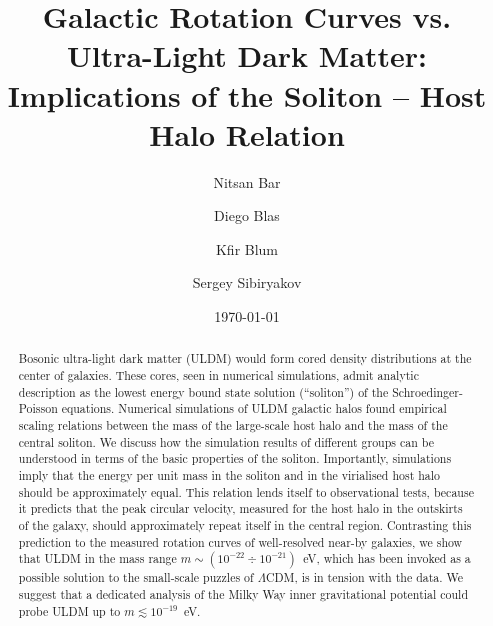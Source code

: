 \documentclass[aps,prd,floats,superscriptaddress,showpacs,nofootinbib,twocolumn,preprintnumbers]{revtex4-1}%
\begin{document}
\title{Galactic Rotation Curves vs. Ultra-Light Dark Matter:\\
Implications of the Soliton -- Host Halo Relation}

\author{Nitsan Bar} 

\author{Diego Blas}

\author{Kfir Blum}
 
\author{Sergey Sibiryakov}

\date{\today}

\begin{abstract}
%
Bosonic ultra-light dark matter (ULDM) would form cored density
distributions at the center of galaxies. These cores, seen in
numerical simulations, admit analytic description as the
lowest energy bound state
solution (``soliton'') of the Schroedinger-Poisson equations.
%
Numerical simulations of ULDM galactic halos found empirical scaling
relations between the mass of the large-scale host halo and the mass
of the central soliton. 
%
We discuss how the simulation results of different groups can be
understood in terms of the basic properties of the
soliton. Importantly, simulations imply that the energy per unit
mass in the soliton and in the virialised host halo should be
approximately equal. This relation lends itself
to observational tests, because it predicts that the 
peak circular velocity, measured for the host halo in the outskirts of the galaxy, should
approximately repeat itself in the central region. Contrasting this prediction to the measured rotation curves of well-resolved near-by galaxies, we show that
ULDM in the mass range $m\sim (10^{-22}\div 10^{-21})$~eV, which has
been invoked as a possible solution to the small-scale puzzles of
$\Lambda$CDM, is in tension with the data. 
%
We suggest that a dedicated analysis of the Milky Way inner
gravitational potential 
could probe ULDM up to $m\lesssim 10^{-19}$~eV.  
%
\end{abstract}
\end{document}
